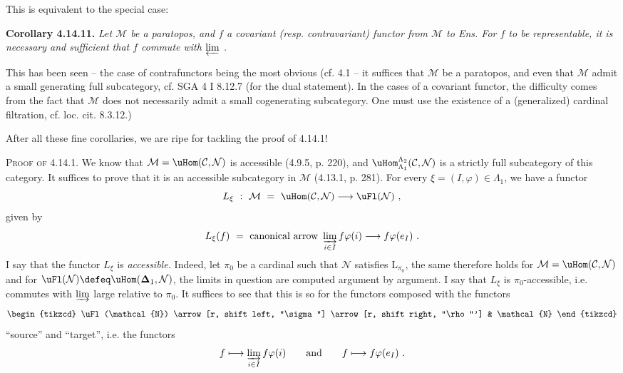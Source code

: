 
This is equivalent to the special case:

\textbf{Corollary 4.14.11.} \textit{Let $\mathcal{M}$ be a paratopos, and $f$ a covariant (resp. contravariant) functor from $\mathcal{M}$ to \textup{Ens}. For $f$ to be representable, it is necessary and sufficient that $f$ commute with $\varprojlim$ .}

This has been seen -- the case of contrafunctors being the most obvious (cf. 4.1 -- it suffices that $\mathcal{M}$ be a paratopos, and even that $\mathcal{M}$ admit a small generating full subcategory, cf. SGA 4 I 8.12.7 (for the dual statement). In the cases of a covariant functor, the difficulty comes from the fact that $\mathcal{M}$ does not necessarily admit a small cogenerating subcategory. One must use the existence of a (generalized) cardinal filtration, cf. loc. cit. 8.3.12.) %

After all these fine corollaries, we are ripe for tackling the proof of 4.14.1!

\textsc{Proof of} 4.14.1. We know that $\mathcal{M} = \uHom(\mathcal{C},\mathcal{N})$ is accessible (4.9.5, p. 220), and $\uHom^{\Lambda_2}_{\Lambda_1}(\mathcal{C},\mathcal{N})$ is a strictly full subcategory of this category. It suffices to prove that it is an accessible subcategory in $\mathcal{M}$ (4.13.1, p. 281). For every $\xi = (I,\varphi) \in \Lambda_1$, we have a functor
\[
L_\xi \ : \ \mathcal{M} \ = \ \uHom(\mathcal{C},\mathcal{N}) \longrightarrow \uFl(\mathcal{N}) \ ,
\]
given by
\[
L_\xi(f) \ = \ \text{canonical arrow } \varinjlim_{i\in I} f\varphi(i) \longrightarrow f\varphi(e_I) \ .
\]
I say that the functor $L_\xi$ is \textit{accessible.} Indeed, let $\pi_0$ be a cardinal such that $\mathcal{N}$ satisfies $\mathrm{L}_{\pi_0}$, the same therefore holds for $\mathcal{M} = \uHom(\mathcal{C},\mathcal{N})$ and for $\uFl(\mathcal{N}) \defeq \uHom(\boldsymbol{\Delta}_1,\mathcal{N})$, the limits in question are computed argument by argument. I say that $L_\xi$ is $\pi_0$-accessible, i.e. commutes with $\varinjlim$ large relative to $\pi_0$. It suffices to see that this is so for the functors composed with the functors
\[
\begin{tikzcd}
\uFl(\mathcal{N}) \arrow[r, shift left, "\sigma"] \arrow[r, shift right, "\rho"'] & \mathcal{N}
\end{tikzcd}
\]
``source'' and ``target'', i.e. the functors
\[
f \longmapsto \varinjlim_{i\in I} f\varphi(i) \qquad \text{and} \qquad f \longmapsto f\varphi(e_I) \ .
\]

